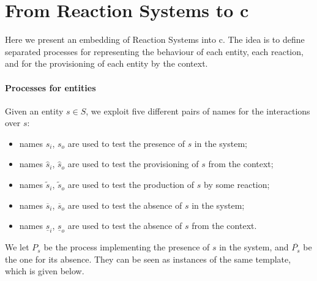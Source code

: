 

\section{From Reaction Systems to c\CNA}
\label{sec:trans}
Here we present {\color{red} an embedding of}
Reaction Systems {\color{red} into} c\CNA.
The idea is to define separated processes for representing the behaviour of each entity, each reaction, 
and for the provisioning of each entity by the context.

\paragraph{Processes for entities}
Given an entity $s \in S$, we exploit five different pairs of names for the interactions over $s$:
\begin{itemize}
\item names $s_i$, $s_o$ are used to test the presence of $s$ in the system; 
\item names $\widehat{s}_i$, $\widehat{s}_o$ are used to test the provisioning of $s$ from the context;
\item names $\widetilde{s}_i$, $\widetilde{s}_o$  are used to test the production of $s$ by some reaction; 
\item names $\overline{s}_i$, $\overline{s}_o$ are used to test the absence of $s$ in the system; 
\item  names $\underline{s}_i$, $\underline{s}_o$ are used to test the absence of $s$ from the context.
\end{itemize}
We let $P_s$ be the process implementing the  presence of $s$ in the system, and $\overline{P_s}$ be the one for its absence.
They can be seen as instances of the same template, which is given below. 

